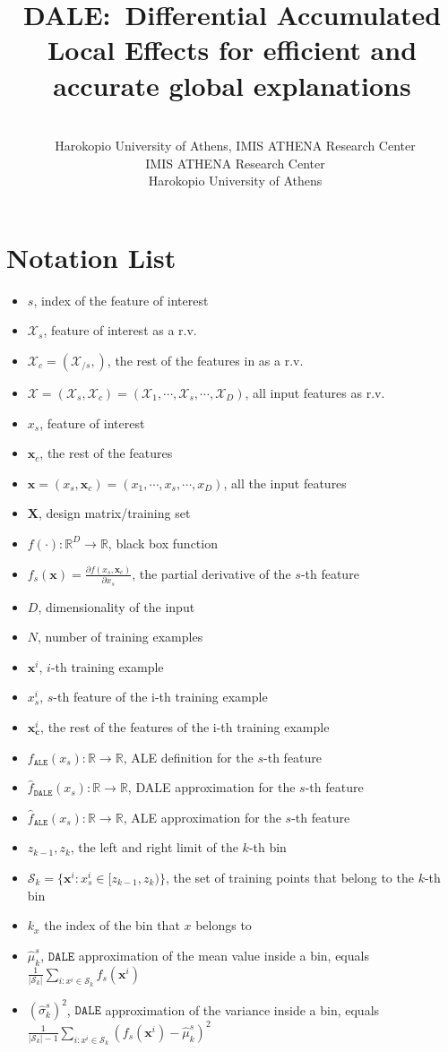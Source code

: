 \documentclass[wcp]{jmlr}
\title[DALE:~Differential Accumulated Local Effects]{DALE:~Differential Accumulated Local Effects for efficient and accurate global explanations}
\author{\Name{Vasilis Gkolemis} \Email{gkolemis@hua.gr, vgkolemis@athenarc.gr}\\
  \addr~Harokopio University of Athens, IMIS ATHENA Research Center
  \AND
  \Name{Theodore Dalamagas} \Email{dalamag@athenarc.gr}\\
  \addr~IMIS ATHENA Research Center
  \AND
  \Name{Christos Diou} \Email{diou@hua.gr}\\
  \addr~Harokopio University of Athens
}
\newcommand{\xc}{\mathbf{x}_c}
\newcommand{\xci}{\mathbf{x}^i_{\mathbf{c}}}
\newcommand{\xb}{\mathbf{x}}
\newcommand{\R}{\mathbb{R}}
\begin{document}
\maketitle

\section{Notation List}
\label{sec:not-list}
%
\begin{itemize}
\item \( s \), index of the feature of interest
\item \( \mathcal{X}_s \), feature of interest as a r.v.
\item \( \mathcal{X}_c = (\mathcal{X}_{/s}, )\), the rest of the features in as a r.v.
\item \( \mathcal{X} = (\mathcal{X}_s, \mathcal{X}_c) = (\mathcal{X}_1, \cdots, \mathcal{X}_s, \cdots, \mathcal{X}_D) \), all input features as r.v.
\item \( x_s \), feature of interest
\item \( \xc \), the rest of the features
\item \( \xb = (x_s, \xc) = (x_1, \cdots, x_s, \cdots, x_D)\), all the input features
\item \( \mathbf{X} \), design matrix/training set
\item \( f(\cdot) : \R^D \rightarrow \R \), black box function
\item \( f_s(\xb) = \frac{\partial f(x_s, \xc)}{\partial x_s} \), the partial derivative of the \( s \)-th feature
\item \( D \), dimensionality of the input
\item \( N \), number of training examples
\item \( \xb^i \), \(i\)-th training example
\item \( x^i_s \), \(s\)-th feature of the i-th training example
\item \( \xci \), the rest of the features of the i-th training example
\item \( f_{\mathtt{ALE}}(x_s) : \R \rightarrow \R\), ALE definition for the \(s\)-th feature
\item \( \hat{f}_{\mathtt{DALE}}(x_s) : \R \rightarrow \R\), DALE approximation for the \(s\)-th feature
\item \( \hat{f}_{\mathtt{ALE}}(x_s) : \R \rightarrow \R\), ALE approximation for the \(s\)-th feature
\item \( z_{k-1}, z_k\), the left and right limit of the \( k\)-th bin
\item \( \mathcal{S}_k = \{ \xb^i : x^i_s \in [z_{k-1}, z_k) \}\), the set of training points that belong to the \( k\)-th bin
\item \( k_x \) the index of the bin that \( x \) belongs to
\item \( \hat{\mu}_k^s\), \(\mathtt{DALE}\) approximation of the mean value inside a bin, equals \( \frac{1}{|\mathcal{S}_k|} \sum_{i: x^i\in \mathcal{S}_k} f_s(\xb^i) \)
\item \( (\hat{\sigma}_k^s)^2\), \(\mathtt{DALE}\) approximation of the variance inside a bin, equals \( \frac{1}{|\mathcal{S}_k|-1} \sum_{i: x^i\in \mathcal{S}_k} (f_s(\xb^i) - \hat{\mu}_k^s)^2 \)


\end{itemize}
\end{document}
